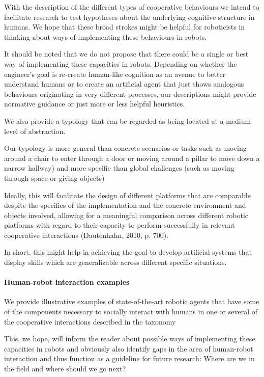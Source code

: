 \documentclass{article}
\begin{document}
With the description of the different types of cooperative behaviours we intend
to facilitate research to test hypotheses about the underlying cognitive
structure in humans. We hope that these
broad strokes might be helpful for roboticists in thinking about ways of
implementing these behaviours in robots.

It should be noted that we do not propose that there could be a
single or best way of implementing these capacities in robots. Depending on
whether the engineer's goal is re-create human-like cognition as an
avenue to better understand humans or to create an artificial agent that
just shows analogous behaviours originating in very different processes, our
descriptions might provide normative guidance or just more or less helpful
heuristics.

We also provide a typology that can be regarded as being located at a
medium level of abstraction. 

Our typology is more general than concrete scenarios or tasks
such as moving around a chair to enter through a door or moving around
a pillar to move down a narrow hallway) and more specific than global
challenges (such as moving through space or giving objects)

Ideally, this will facilitate the design of different platforms
that are comparable despite the specifics of the implementation and the
concrete environment and objects involved, allowing for a meaningful
comparison across different robotic platforms with regard to their
capacity to perform successfully in relevant cooperative interactions
(Dautenhahn, 2010, p. 700).

In short, this might help in achieving the goal to develop
artificial systems that display skills which are generalizable across
different specific situations.

\paragraph{Human-robot interaction examples} We provide illustrative examples
of state-of-the-art robotic agents that have some of the components necessary
to socially interact with humans in one or several of the cooperative
interactions described in the taxonomy

This, we hope, will inform the reader about possible ways of implementing these
capacities in robots and obviously also identify gaps in the area of
human-robot interaction and thus function as a guideline for future research:
Where are we in the field and where should we go next?
\end{document}
